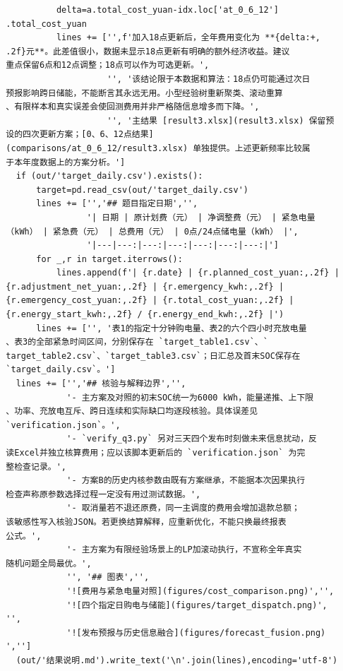 \begin{verbatim}
            delta=a.total_cost_yuan-idx.loc['at_0_6_12']
  .total_cost_yuan
            lines += ['',f'加入18点更新后，全年费用变化为 **{delta:+,
  .2f}元**。此差值很小，数据未显示18点更新有明确的额外经济收益。建议
  重点保留6点和12点调整；18点可以作为可选更新。',
                      '', '该结论限于本数据和算法：18点仍可能通过次日
  预报影响跨日储能，不能断言其永远无用。小型经验树重新聚类、滚动重算
  、有限样本和真实误差会使回测费用并非严格随信息增多而下降。',
                      '', '主结果 [result3.xlsx](result3.xlsx) 保留预
  设的四次更新方案；[0、6、12点结果]
  (comparisons/at_0_6_12/result3.xlsx) 单独提供。上述更新频率比较属
  于本年度数据上的方案分析。']
    if (out/'target_daily.csv').exists():
        target=pd.read_csv(out/'target_daily.csv')
        lines += ['','## 题目指定日期','',
                  '| 日期 | 原计划费（元） | 净调整费（元） | 紧急电量
  （kWh） | 紧急费（元） | 总费用（元） | 0点/24点储电量（kWh） |',
                  '|---|---:|---:|---:|---:|---:|---:|']
        for _,r in target.iterrows():
            lines.append(f'| {r.date} | {r.planned_cost_yuan:,.2f} |
  {r.adjustment_net_yuan:,.2f} | {r.emergency_kwh:,.2f} |
  {r.emergency_cost_yuan:,.2f} | {r.total_cost_yuan:,.2f} |
  {r.energy_start_kwh:,.2f} / {r.energy_end_kwh:,.2f} |')
        lines += ['', '表1的指定十分钟购电量、表2的六个四小时充放电量
  、表3的全部紧急时间区间，分别保存在 `target_table1.csv`、`
  target_table2.csv`、`target_table3.csv`；日汇总及首末SOC保存在
  `target_daily.csv`。']
    lines += ['','## 核验与解释边界','',
              '- 主方案及对照的初末SOC统一为6000 kWh，能量递推、上下限
  、功率、充放电互斥、跨日连续和实际缺口均逐段核验。具体误差见
  `verification.json`。',
              '- `verify_q3.py` 另对三天四个发布时刻做未来信息扰动，反
  读Excel并独立核算费用；应以该脚本更新后的 `verification.json` 为完
  整检查记录。',
              '- 方案B的历史内核参数由既有方案继承，不能据本次因果执行
  检查声称原参数选择过程一定没有用过测试数据。',
              '- 取消量若不退还原费，同一主调度的费用会增加退款总额；
  该敏感性写入核验JSON。若更换结算解释，应重新优化，不能只换最终报表
  公式。',
              '- 主方案为有限经验场景上的LP加滚动执行，不宣称全年真实
  随机问题全局最优。',
              '', '## 图表','',
              '![费用与紧急电量对照](figures/cost_comparison.png)','',
              '![四个指定日购电与储能](figures/target_dispatch.png)',
  '',
              '![发布预报与历史信息融合](figures/forecast_fusion.png)
  ','']
    (out/'结果说明.md').write_text('\n'.join(lines),encoding='utf-8')



\end{verbatim}
